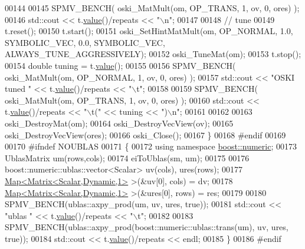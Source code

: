 \begin{DoxyCode}
00144 
00145       SPMV\_BENCH( oski\_MatMult(om, OP\_TRANS, 1, ov, 0, ores) );
00146       std::cout << t.\hyperlink{class_eigen_1_1_bench_timer_a26760f963ed8b64c126159bfea57735e}{value}()/repeats << \textcolor{stringliteral}{"\(\backslash\)n"};
00147 
00148       \textcolor{comment}{// tune}
00149       t.reset();
00150       t.start();
00151       oski\_SetHintMatMult(om, OP\_NORMAL, 1.0, SYMBOLIC\_VEC, 0.0, SYMBOLIC\_VEC, ALWAYS\_TUNE\_AGGRESSIVELY);
00152       oski\_TuneMat(om);
00153       t.stop();
00154       \textcolor{keywordtype}{double} tuning = t.\hyperlink{class_eigen_1_1_bench_timer_a26760f963ed8b64c126159bfea57735e}{value}();
00155 
00156       SPMV\_BENCH( oski\_MatMult(om, OP\_NORMAL, 1, ov, 0, ores) );
00157       std::cout << \textcolor{stringliteral}{"OSKI tuned  "} << t.\hyperlink{class_eigen_1_1_bench_timer_a26760f963ed8b64c126159bfea57735e}{value}()/repeats << \textcolor{stringliteral}{"\(\backslash\)t"};
00158 
00159       SPMV\_BENCH( oski\_MatMult(om, OP\_TRANS, 1, ov, 0, ores) );
00160       std::cout << t.\hyperlink{class_eigen_1_1_bench_timer_a26760f963ed8b64c126159bfea57735e}{value}()/repeats << \textcolor{stringliteral}{"\(\backslash\)t("} << tuning <<  \textcolor{stringliteral}{")\(\backslash\)n"};
00161 
00162 
00163       oski\_DestroyMat(om);
00164       oski\_DestroyVecView(ov);
00165       oski\_DestroyVecView(ores);
00166       oski\_Close();
00167     \}
00168 \textcolor{preprocessor}{    #endif}
00169 
00170 \textcolor{preprocessor}{    #ifndef NOUBLAS}
00171     \{
00172       \textcolor{keyword}{using namespace }\hyperlink{namespaceboost_1_1numeric}{boost::numeric};
00173       UblasMatrix um(rows,cols);
00174       eiToUblas(sm, um);
00175 
00176       boost::numeric::ublas::vector<Scalar> uv(cols), ures(rows);
00177       \hyperlink{group___core___module_class_eigen_1_1_map}{Map<Matrix<Scalar,Dynamic,1>} >(&uv[0], cols) = dv;
00178       \hyperlink{group___core___module_class_eigen_1_1_map}{Map<Matrix<Scalar,Dynamic,1>} >(&ures[0], rows) = res;
00179 
00180       SPMV\_BENCH(ublas::axpy\_prod(um, uv, ures, \textcolor{keyword}{true}));
00181       std::cout << \textcolor{stringliteral}{"ublas       "} << t.\hyperlink{class_eigen_1_1_bench_timer_a26760f963ed8b64c126159bfea57735e}{value}()/repeats << \textcolor{stringliteral}{"\(\backslash\)t"};
00182 
00183       SPMV\_BENCH(ublas::axpy\_prod(boost::numeric::ublas::trans(um), uv, ures, \textcolor{keyword}{true}));
00184       std::cout << t.\hyperlink{class_eigen_1_1_bench_timer_a26760f963ed8b64c126159bfea57735e}{value}()/repeats << endl;
00185     \}
00186 \textcolor{preprocessor}{    #endif}

\end{DoxyCode}
